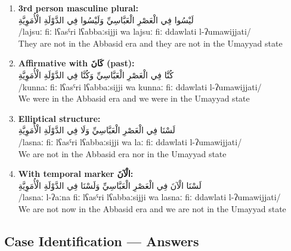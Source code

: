 \documentclass[letterpaper,12pt]{article}
\begin{document}
\begin{enumerate}
\item \textbf{3rd person masculine plural:}\\
\textarabic{لَيْسُوا فِي الْعَصْرِ الْعَبَّاسِيِّ وَلَيْسُوا فِي الدَّوْلَةِ الْأُمَوِيَّةِ}\\
/lajsuː fiː lʕasˤri lʕabbaːsijji wa lajsuː fiː ddawlati l-ʔumawijjati/\\
They are not in the Abbasid era and they are not in the Umayyad state

\item \textbf{Affirmative with \textarabic{كَانَ} (past):}\\
\textarabic{كُنَّا فِي الْعَصْرِ الْعَبَّاسِيِّ وَكُنَّا فِي الدَّوْلَةِ الْأُمَوِيَّةِ}\\
/kunnaː fiː lʕasˤri lʕabbaːsijji wa kunnaː fiː ddawlati l-ʔumawijjati/\\
We were in the Abbasid era and we were in the Umayyad state

\item \textbf{Elliptical structure:}\\
\textarabic{لَسْنَا فِي الْعَصْرِ الْعَبَّاسِيِّ وَلَا فِي الدَّوْلَةِ الْأُمَوِيَّةِ}\\
/lasnaː fiː lʕasˤri lʕabbaːsijji wa laː fiː ddawlati l-ʔumawijjati/\\
We are not in the Abbasid era nor in the Umayyad state

\item \textbf{With temporal marker \textarabic{الْآنَ}:}\\
\textarabic{لَسْنَا الْآنَ فِي الْعَصْرِ الْعَبَّاسِيِّ وَلَسْنَا فِي الدَّوْلَةِ الْأُمَوِيَّةِ}\\
/lasnaː l-ʔaːna fiː lʕasˤri lʕabbaːsijji wa lasnaː fiː ddawlati l-ʔumawijjati/\\
We are not now in the Abbasid era and we are not in the Umayyad state
\end{enumerate}

\subsection{Case Identification — Answers}
\end{document}
